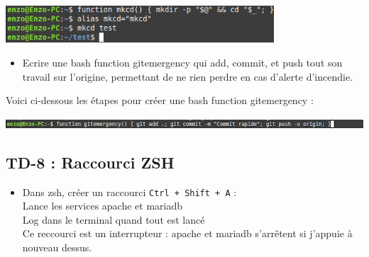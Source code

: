 \documentclass[12pt]{article}
\begin{document}
\vspace{0.3cm}

\begin{center}
  \includegraphics[width=10cm]{Images-TD-Env-Efficiency/Image-TD-5/mkcd.png}
\end{center}

\vspace{0.3cm}

\begin{itemize}
  \item Ecrire une bash function gitemergency qui add, commit, et push tout son travail sur l'origine, permettant de ne rien perdre en cas d'alerte d'incendie.
\end{itemize}

\vspace{0.3cm}

Voici ci-dessous les étapes pour créer une bash function gitemergency :

\vspace{0.3cm}

\begin{center}
  \includegraphics[width=14cm]{Images-TD-Env-Efficiency/Image-TD-5/gitemergency.png}
\end{center}

\newpage

\subsection{TD-8 : Raccourci ZSH}

\vspace{0.3cm}

\begin{itemize}
  \item Dans zsh, créer un raccourci \texttt{Ctrl + Shift + A} :\\
  Lance les services apache et mariadb\\
  Log dans le terminal quand tout est lancé\\
  Ce reccourci est un interrupteur : apache et mariadb s'arrêtent si j'appuie à nouveau dessus.
\end{itemize}

\vspace{0.3cm}
\end{document}
